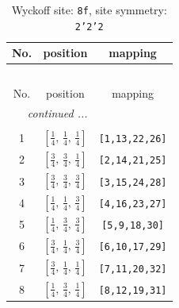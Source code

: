 \documentclass[fleqn,8pt]{jsarticle}
\begin{document}
\begin{longtable}{ccc}
\caption{Wyckoff site: {\tt 8f}, site symmetry: {\tt 2'2'2}}
 \\
 \hline \hline
No. & position & mapping \\ \hline \endfirsthead

\multicolumn{2}{l}{\tablename\ \thetable{}} \\
 \hline \hline
No. & position & mapping \\ \hline \endhead

 \hline \hline
\multicolumn{2}{r}{\footnotesize\it continued ...} \\ \endfoot

 \hline \hline
\multicolumn{2}{r}{} \\ \endlastfoot

1 & $\left[ \frac{1}{4},\, \frac{1}{4},\, \frac{1}{4} \right]$ & {\tt [1,13,22,26]} \\ \hline
2 & $\left[ \frac{3}{4},\, \frac{3}{4},\, \frac{1}{4} \right]$ & {\tt [2,14,21,25]} \\ \hline
3 & $\left[ \frac{3}{4},\, \frac{3}{4},\, \frac{3}{4} \right]$ & {\tt [3,15,24,28]} \\ \hline
4 & $\left[ \frac{1}{4},\, \frac{1}{4},\, \frac{3}{4} \right]$ & {\tt [4,16,23,27]} \\ \hline
5 & $\left[ \frac{1}{4},\, \frac{3}{4},\, \frac{3}{4} \right]$ & {\tt [5,9,18,30]} \\ \hline
6 & $\left[ \frac{3}{4},\, \frac{1}{4},\, \frac{3}{4} \right]$ & {\tt [6,10,17,29]} \\ \hline
7 & $\left[ \frac{3}{4},\, \frac{1}{4},\, \frac{1}{4} \right]$ & {\tt [7,11,20,32]} \\ \hline
8 & $\left[ \frac{1}{4},\, \frac{3}{4},\, \frac{1}{4} \right]$ & {\tt [8,12,19,31]} \\
\end{longtable}
\renewcommand{\arraystretch}{1.2}
\end{document}
